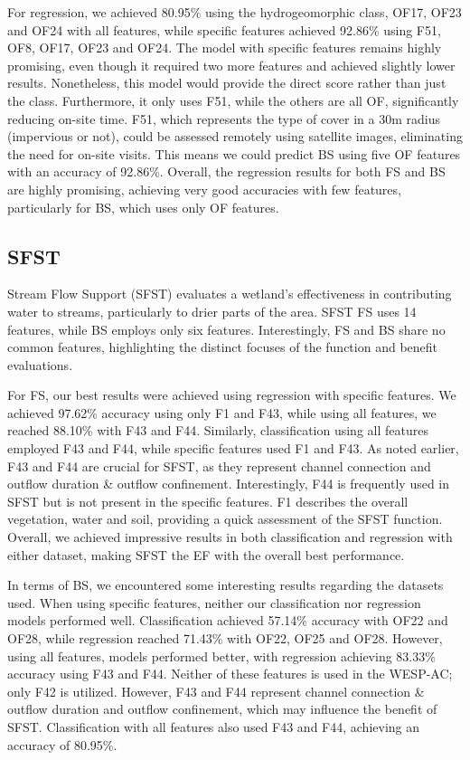 \documentclass[12pt,letterpaper]{article}
\begin{document}
For regression, we achieved 80.95\% using the hydrogeomorphic class, OF17, OF23 and OF24 with all features, while specific features achieved 92.86\% using F51, OF8, OF17, OF23 and OF24.
The model with specific features remains highly promising, even though it required two more features and achieved slightly lower results.
Nonetheless, this model would provide the direct score rather than just the class.
Furthermore, it only uses F51, while the others are all OF, significantly reducing on-site time.
F51, which represents the type of cover in a 30m radius (impervious or not), could be assessed remotely using satellite images, eliminating the need for on-site visits.
This means we could predict \ac{BS} using five OF features with an accuracy of 92.86\%.
Overall, the regression results for both \ac{FS} and \ac{BS} are highly promising, achieving very good accuracies with few features, particularly for \ac{BS}, which uses only OF features.

\subsection{SFST}
Stream Flow Support (\ac{SFST}) evaluates a wetland's effectiveness in contributing water to streams, particularly to drier parts of the area.
\ac{SFST} \ac{FS} uses 14 features, while \ac{BS} employs only six features.
Interestingly, \ac{FS} and \ac{BS} share no common features, highlighting the distinct focuses of the function and benefit evaluations.

For \ac{FS}, our best results were achieved using regression with specific features.
We achieved 97.62\% accuracy using only F1 and F43, while using all features, we reached 88.10\% with F43 and F44.
Similarly, classification using all features employed F43 and F44, while specific features used F1 and F43.
As noted earlier, F43 and F44 are crucial for \ac{SFST}, as they represent channel connection and outflow duration \& outflow confinement.
Interestingly, F44 is frequently used in \ac{SFST} but is not present in the specific features.
F1 describes the overall vegetation, water and soil, providing a quick assessment of the \ac{SFST} function.
Overall, we achieved impressive results in both classification and regression with either dataset, making \ac{SFST} the \ac{EF} with the overall best performance.

In terms of \ac{BS}, we encountered some interesting results regarding the datasets used.
When using specific features, neither our classification nor regression models performed well.
Classification achieved 57.14\% accuracy with OF22 and OF28, while regression reached 71.43\% with OF22, OF25 and OF28.
However, using all features, models performed better, with regression achieving 83.33\% accuracy using F43 and F44.
Neither of these features is used in the WESP-AC; only F42 is utilized.
However, F43 and F44 represent channel connection \& outflow duration and outflow confinement, which may influence the benefit of \ac{SFST}.
Classification with all features also used F43 and F44, achieving an accuracy of 80.95\%.
\end{document}
